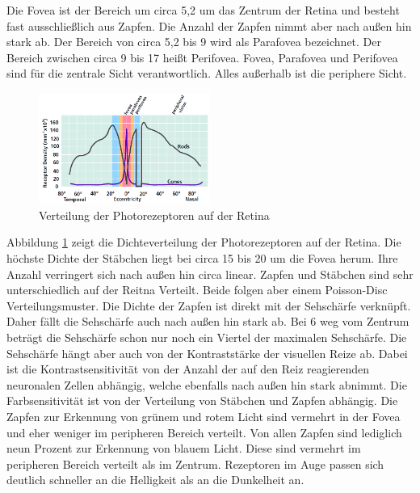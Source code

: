 Die Fovea ist der Bereich um circa 5,2\textdegree{} um das Zentrum der Retina und besteht fast ausschließlich aus Zapfen.
Die Anzahl der Zapfen nimmt aber nach außen hin stark ab.
Der Bereich von circa 5,2\textdegree{} bis 9\textdegree{} wird als Parafovea bezeichnet.
Der Bereich zwischen circa 9\textdegree{} bis 17\textdegree{} heißt Perifovea.
Fovea, Parafovea und Perifovea sind für die zentrale Sicht verantwortlich.
Alles außerhalb ist die periphere Sicht.
\begin{figure}
	\centering
	\includegraphics[width=0.5\textwidth]{../../Grafiken/Retinal-photoreceptor-distr_from-star-report.PNG}
	\caption{Verteilung der Photorezeptoren auf der Retina \cite{doi:10.1111/cfg.13150}}
	\label{fig::eye02}
\end{figure}
Abbildung \ref{fig::eye02} zeigt die Dichteverteilung der Photorezeptoren auf der Retina.
Die höchste Dichte der Stäbchen liegt bei circa 15\textdegree{} bis 20\textdegree{} um die Fovea herum.
Ihre Anzahl verringert sich nach außen hin circa linear.
Zapfen und Stäbchen sind sehr unterschiedlich auf der Reitna Verteilt.
Beide folgen aber einem Poisson-Disc Verteilungsmuster.
Die Dichte der Zapfen ist direkt mit der Sehschärfe verknüpft.
Daher fällt die Sehschärfe auch nach außen hin stark ab.
Bei 6\textdegree{} weg vom Zentrum beträgt die Sehschärfe schon nur noch ein Viertel der maximalen Sehschärfe.
Die Sehschärfe hängt aber auch von der Kontraststärke der visuellen Reize ab.
Dabei ist die Kontrastsensitivität von der Anzahl der auf den Reiz reagierenden neuronalen Zellen abhängig, welche ebenfalls nach außen hin stark abnimmt.
Die Farbsensitivität ist von der Verteilung von Stäbchen und Zapfen abhängig.
Die Zapfen zur Erkennung von grünem und rotem Licht sind vermehrt in der Fovea und eher weniger im peripheren Bereich verteilt.
Von allen Zapfen sind lediglich neun Prozent zur Erkennung von blauem Licht.
Diese sind vermehrt im peripheren Bereich verteilt als im Zentrum.
Rezeptoren im Auge passen sich deutlich schneller an die Helligkeit als an die Dunkelheit an.

